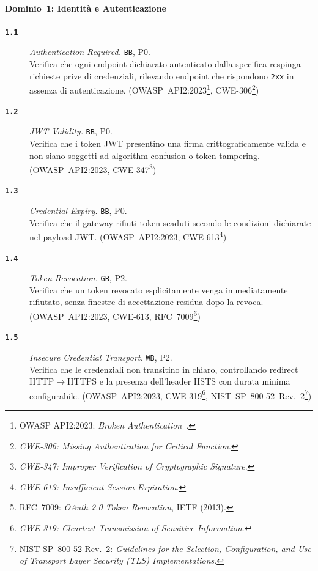 \paragraph{Dominio~1: Identità e Autenticazione}
\begin{description}
      \item[\textbf{\texttt{1.1}}]
            \textit{Authentication Required.} \texttt{BB}, P0.\\
            Verifica che ogni endpoint dichiarato autenticato dalla specifica respinga richieste prive di credenziali, rilevando endpoint che rispondono \texttt{2xx} in assenza di autenticazione.
            (\gls{OWASP}~API2:2023\footnote{\gls{OWASP} API2:2023: \textit{Broken Authentication}~\cite{OWASPTop10}.}, \gls{CWE}-306\footnote{\textit{CWE-306: Missing Authentication for Critical Function}.})

      \item[\textbf{\texttt{1.2}}]
            \textit{JWT Validity.} \texttt{BB}, P0.\\
            Verifica che i token \gls{JWT} presentino una firma crittograficamente valida e non siano soggetti ad algorithm confusion o token tampering.
            (\gls{OWASP}~API2:2023, \gls{CWE}-347\footnote{\textit{CWE-347: Improper Verification of Cryptographic Signature}.})

      \item[\textbf{\texttt{1.3}}]
            \textit{Credential Expiry.} \texttt{BB}, P0.\\
            Verifica che il gateway rifiuti token scaduti secondo le condizioni dichiarate nel payload \gls{JWT}.
            (\gls{OWASP}~API2:2023, \gls{CWE}-613\footnote{\textit{CWE-613: Insufficient Session Expiration}.})

      \item[\textbf{\texttt{1.4}}]
            \textit{Token Revocation.} \texttt{GB}, P2.\\
            Verifica che un token revocato esplicitamente venga immediatamente rifiutato, senza finestre di accettazione residua dopo la revoca.
            (\gls{OWASP}~API2:2023, \gls{CWE}-613, \gls{RFC}~7009\footnote{\gls{RFC}~7009: \textit{OAuth 2.0 Token Revocation}, IETF (2013).})

      \item[\textbf{\texttt{1.5}}]
            \textit{Insecure Credential Transport.} \texttt{WB}, P2.\\
            Verifica che le credenziali non transitino in chiaro, controllando redirect \gls{HTTP}$\to$\gls{HTTPS} e la presenza dell'header \gls{HSTS} con durata minima configurabile.
            (\gls{OWASP}~API2:2023, \gls{CWE}-319\footnote{\textit{CWE-319: Cleartext Transmission of Sensitive Information}.}, \gls{NIST}~SP~800-52~Rev.~2\footnote{\gls{NIST} SP~800-52 Rev.~2: \textit{Guidelines for the Selection, Configuration, and Use of Transport Layer Security (TLS) Implementations}.})


\end{description}
